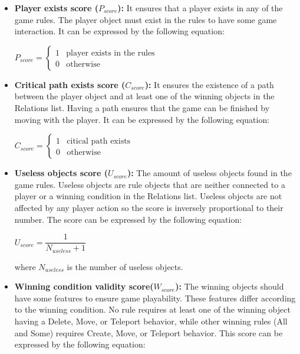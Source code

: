 \begin{itemize} \itemsep0pt \parskip0pt 
	\item \textbf{Player exists score ($P_{score}$):} It ensures that a player exists in any of the game rules. The player object must exist in the rules to have some game interaction. It can be expressed by the following equation:
	\begin{center}
		$P_{score}= \begin{cases}
		               1 & \text{player exists in the rules}\\
		               0 & \text{otherwise}
		           \end{cases}$
		\end{center}
	\item \textbf{Critical path exists score ($C_{score}$):} It ensures the existence of a path between the player object and at least one of the winning objects in the Relations list. Having a path ensures that the game can be finished by moving with the player. It can be expressed by the following equation:
	\begin{center}
	$C_{score}= \begin{cases}
	               1 & \text{citical path exists}\\
	               0 & \text{otherwise}
	           \end{cases}$
	\end{center}
	\item \textbf{Useless objects score ($U_{score}$):} The amount of useless objects found in the game rules. Useless objects are rule objects that are neither connected to a player or a winning condition in the Relations list. Useless objects are not affected by any player action so the score is inversely proportional to their number. The score can be expressed by the following equation:
	\begin{center}
	$U_{score} = \dfrac{1}{N_{useless} + 1}$
	\end{center}
	where $N_{useless}$ is the number of useless objects.
	\item \textbf{Winning condition validity score($W_{score}$):} The winning objects should have some features to ensure game playability. These features differ according to the winning condition. No rule requires at least one of the winning object having a Delete, Move, or Teleport behavior, while other winning rules (All and Some) requires Create, Move, or Teleport behavior. This score can be expressed by the following equation:
	\begin{center}

\end{center}
\end{itemize}
